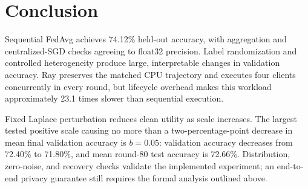 \section{Conclusion}\label{sec:conclusion}
Sequential FedAvg achieves 74.12\% held-out accuracy, with aggregation and centralized-SGD checks agreeing to float32 precision. Label randomization and controlled heterogeneity produce large, interpretable changes in validation accuracy. Ray preserves the matched CPU trajectory and executes four clients concurrently in every round, but lifecycle overhead makes this workload approximately 23.1 times slower than sequential execution.

Fixed Laplace perturbation reduces clean utility as scale increases. The largest tested positive scale causing no more than a two-percentage-point decrease in mean final validation accuracy is $b=0.05$: validation accuracy decreases from 72.40\% to 71.80\%, and mean round-80 test accuracy is 72.66\%. Distribution, zero-noise, and recovery checks validate the implemented experiment; an end-to-end privacy guarantee still requires the formal analysis outlined above.
